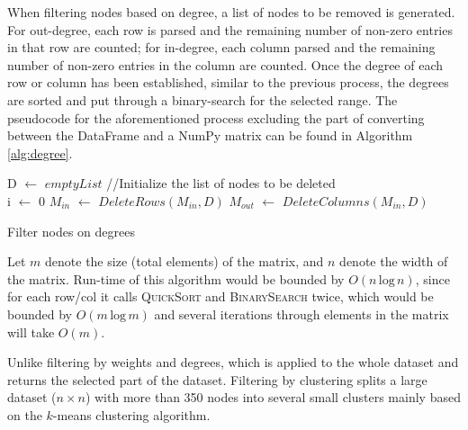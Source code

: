 \documentclass[journal]{vgtc}                %
\begin{document}
When filtering nodes based on degree, a list of nodes to be removed is generated. 
For out-degree, each row is parsed and the remaining number of non-zero entries in that row are counted; for in-degree, each column parsed and the remaining number of non-zero entries in the column are counted. Once the degree of each row or column has been established, similar to the previous process, the degrees are sorted and put through a binary-search for the selected range. 
The pseudocode for the aforementioned process excluding the part of converting between the DataFrame and a NumPy matrix can be found in Algorithm \ref{alg:degree}.
\begin{algorithm}[hbt]
 D $\leftarrow$ $emptyList$\; //Initialize the list of nodes to be deleted\\
 i $\leftarrow$ 0\;
  $M_{in}$ $\leftarrow$ $DeleteRows(M_{in}, D)$\;
  $M_{out}$ $\leftarrow$ $DeleteColumns(M_{in}, D)$\;
 \caption{Filter nodes on degrees}
 \label{alg:degree}
\end{algorithm}
Let $m$ denote the size (total elements) of the matrix, and $n$ denote the width of the matrix. Run-time of this algorithm would be bounded by $O(n \, \text{log} \, n)$, since for each row/col it  calls \textsc{QuickSort} and \textsc{BinarySearch} twice, which would be bounded by $O(m \, \text{log} \, m)$ and several iterations through elements in the matrix will take $O(m)$. 

Unlike filtering by weights and degrees, which is applied to the whole dataset and returns the selected part of the dataset. Filtering by clustering splits a large dataset ($n \times n$) with more than 350 nodes into several small clusters mainly based on the $k$-means clustering algorithm.
\end{document}
